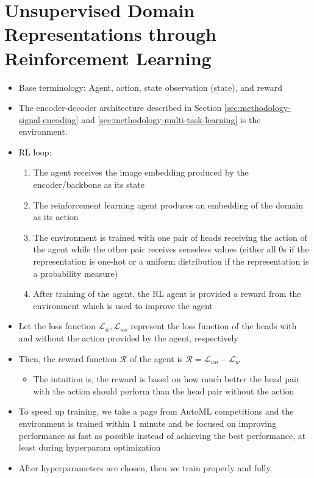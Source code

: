 \section{Unsupervised Domain Representations through Reinforcement Learning}

\begin{itemize}
	\item Base terminology: Agent, action, state observation (state), and reward
	\item The encoder-decoder architecture described in Section \ref{sec:methodology-signal-encoding} and \ref{sec:methodology-multi-task-learning} is the environment.
	\item RL loop:
	\begin{enumerate}
		\item The agent receives the image embedding produced by the encoder/backbone as its state
		\item The reinforcement learning agent produces an embedding of the domain as its action
		\item The environment is trained with one pair of heads receiving the action of the agent while the other pair receives senseless values (either all 0s if the representation is one-hot or a uniform distribution if the representation is a probability measure)
		\item After training of the agent, the RL agent is provided a reward from the environment which is used to improve the agent
	\end{enumerate}
	\item Let the loss function $\mathcal{L}_{w}, \mathcal{L}_{wo}$ represent the loss function of the heads with and without the action provided by the agent, respectively
	\item Then, the reward function $\mathcal{R}$ of the agent is $\mathcal{R} = \mathcal{L}_{wo} - \mathcal{L}_{w}$
	\begin{itemize}
		\item The intuition is, the reward is based on how much better the head pair with the action should perform than the head pair without the action
	\end{itemize}
	\item To speed up training, we take a page from AutoML competitions and the environment is trained within 1 minute and be focused on improving performance as fast as possible instead of achieving the best performance, at least during hyperparam optimization
	\item After hyperparameters are chosen, then we train properly and fully.
\end{itemize}
